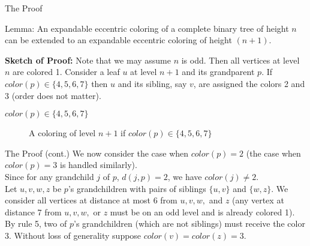 \documentclass{beamer}
\begin{document}
\begin{frame}{The Proof}
\begin{block}{Lemma:}
An expandable eccentric coloring of a complete binary tree of height $n$ can be extended to an expandable eccentric coloring of height $(n+1)$.
\end{block}
{\bfseries{Sketch of Proof:}} Note that we may assume $n$ is odd. Then all vertices at level $n$ are colored 1.  Consider a leaf $u$ at level $n+1$ and its grandparent $p$.  If $color(p)\in\{4,5,6,7\}$ then $u$ and its sibling, say $v$, are assigned the colors 2 and 3 (order does not matter).
\end{frame}

\begin{frame}{$color(p)\in\{4,5,6,7\}$}
\begin{figure}[hbt]\centering
\begin{center}
\end{center}
\caption{A coloring of level $n+1$ if $color(p)\in\{4,5,6,7\}$}\label{colorpknown}
\end{figure}
\end{frame}

\begin{frame}{The Proof (cont.)}
We now consider the case when $color(p)=2$ (the case when $color(p)=3$ is handled similarly).\\ \pause
Since for any grandchild $j$ of $p$, $d(j,p)=2$, we have $color(j)\neq 2$.\\ \pause  Let $u,v,w,z$ be $p$'s grandchildren with pairs of siblings $\{u,v\}$ and $\{w,z\}$.  We consider all vertices at distance at most 6 from $u,v,w,$ and $z$ (any vertex at distance 7 from $u,v,w,$ or $z$ must be on an odd level and is already colored 1).  By rule 5, two of $p$'s grandchildren (which are not siblings) must receive the color 3.  Without loss of generality suppose $color(v)=color(z)=3$.
\end{frame}
\end{document}
